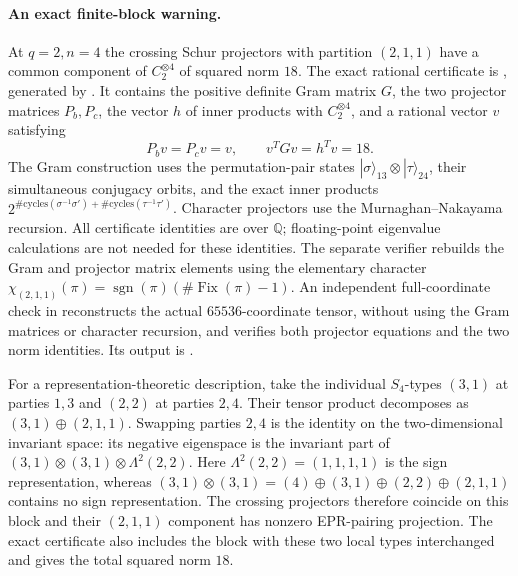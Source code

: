 \paragraph{An exact finite-block warning.}
At $q=2,n=4$ the crossing Schur projectors with partition
$(2,1,1)$ have a common component of $C_2^{\otimes4}$ of squared
norm $18$. The exact rational certificate is
, generated by
. It contains the
positive definite Gram matrix $G$, the two projector matrices
$P_b,P_c$, the vector $h$ of inner products with $C_2^{\otimes4}$,
and a rational vector $v$ satisfying
\[
 P_bv=P_cv=v,\qquad v^TGv=h^Tv=18.
 \tag{PG-OP-certificate}
\]
The Gram construction uses the permutation-pair states
$|\sigma\rangle_{13}\otimes|\tau\rangle_{24}$, their simultaneous
conjugacy orbits, and the exact inner products
$2^{\#\mathrm{cycles}(\sigma^{-1}\sigma')+
\#\mathrm{cycles}(\tau^{-1}\tau')}$. Character projectors use
the Murnaghan--Nakayama recursion. All certificate identities are
over $\mathbb Q$; floating-point eigenvalue calculations are not
needed for these identities. The separate verifier
 rebuilds the
Gram and projector matrix elements using the elementary character
$\chi_{(2,1,1)}(\pi)=\operatorname{sgn}(\pi)
(\#\operatorname{Fix}(\pi)-1)$.
An independent full-coordinate check in
 reconstructs the
actual $65536$-coordinate tensor, without using the Gram matrices
or character recursion, and verifies both projector equations and
the two norm identities. Its output is
.

For a representation-theoretic description, take the individual
$S_4$-types $(3,1)$ at parties $1,3$ and $(2,2)$ at parties $2,4$.
Their tensor product decomposes as $(3,1)\oplus(2,1,1)$.
Swapping parties $2,4$ is the identity on the two-dimensional
invariant space: its negative eigenspace is the invariant part of
$(3,1)\otimes(3,1)\otimes\Lambda^2(2,2)$.
Here $\Lambda^2(2,2)=(1,1,1,1)$ is the sign representation, whereas
$(3,1)\otimes(3,1)=(4)\oplus(3,1)\oplus(2,2)\oplus(2,1,1)$
contains no sign representation.
The crossing projectors therefore coincide on this block and their
$(2,1,1)$ component has nonzero EPR-pairing projection. The exact
certificate also includes the block with these two local types
interchanged and gives the total squared norm $18$.

